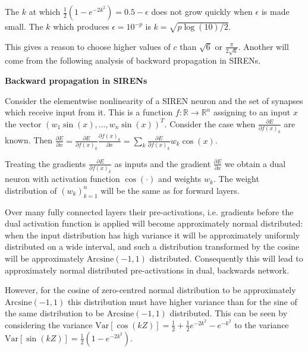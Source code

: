 \documentclass{letter}
\begin{document}
The $k$ at which $\frac{1}{2}(1-e^{-2k^2})=0.5-\epsilon$ does not grow quickly when $\epsilon$ is made small. The $k$ which produces $\epsilon=10^{-p}$ is $k=\sqrt{p\log(10)/2}$.

\begin{center}
\end{center}

This gives a reason to choose higher values of $c$ than $\sqrt{6}$ or $\frac{\pi}{2\sqrt{6}}$. Another will come from the following analysis of backward propagation in SIRENs.

{\bf Backward propagation in SIRENs}

Consider the elementwise nonlinearity of a SIREN neuron and the set of synapses which receive input from it. This is a function $f:\mathbb{R}\rightarrow \mathbb{R}^n$ assigning to an input $x$ the vector $\left(w_{1}\sin(x),...,w_{n}\sin(x)\right)^T$. Consider the case when $\frac{\partial E}{\partial f(x)_k}$ are known. Then $\frac{\partial E}{\partial x}=\frac{\partial E}{\partial f(x)_k}\frac{\partial f(x)_k}{\partial x}=\sum_k \frac{\partial E}{\partial f(x)_k}w_{k}\cos(x)$. 

Treating the gradients $\frac{\partial E}{\partial f(x)_k}$ as inputs and the gradient $\frac{\partial E}{\partial x}$ we obtain a dual neuron with activation function $\cos(\cdot)$ and weights $w_k$. The weight distribution of $\left(w_k\right)_{k=1}^n$ will be the same as for forward layers. 

Over many fully connected layers their pre-activations, i.e. gradients before the dual activation function is applied will become approximately normal distributed: when the input distribution has high variance it will be approximately uniformly distributed on a wide interval, and such a distribution transformed by the cosine will be approximately $\text{Arcsine}(-1,1)$ distributed. Consequently this will lead to approximately normal distributed pre-activations in dual, backwards network.

However, for the cosine of zero-centred normal distribution to be approximately $\text{Arcsine}(-1,1)$ this distribution must have higher variance than for the sine of the same distribution to be $\text{Arcsine}(-1,1)$ distributed. This can be seen by considering the variance $\text{Var}\left[\cos(kZ)\right] = \frac{1}{2} + \frac{1}{2}e^{-2k^2}-e^{-k^2}$ to the variance $\text{Var}\left[\sin(kZ)\right]=\frac{1}{2}(1-e^{-2k^2})$.
\end{document}
